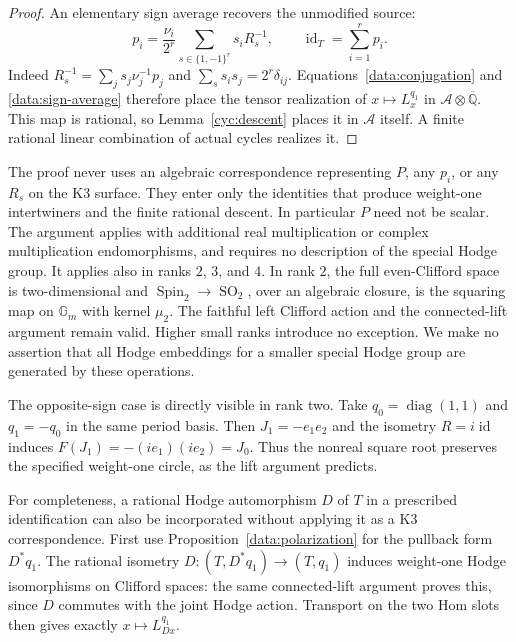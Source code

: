 \begin{proof}
An elementary sign average recovers the unmodified source:
\begin{equation}\label{data:sign-average}
 p_i=\frac{\nu_i}{2^r}
        \sum_{s\in\{1,-1\}^r}s_iR_s^{-1},
 \qquad \operatorname{id}_T=\sum_{i=1}^r p_i.
\end{equation}
Indeed $R_s^{-1}=\sum_j s_j\nu_j^{-1}p_j$ and
$\sum_s s_i s_j=2^r\delta_{ij}$.
Equations~\eqref{data:conjugation} and \eqref{data:sign-average}
therefore place the tensor realization of $x\mapsto L_x^{q_1}$
in $\mathcal A\otimes\overline{\mathbb Q}$.
This map is rational, so Lemma~\ref{cyc:descent} places it in
$\mathcal A$ itself. A finite rational linear combination of
actual cycles realizes it.
\end{proof}

\begin{remark}\label{data:scope}
The proof never uses an algebraic correspondence representing
$P$, any $p_i$, or any $R_s$ on the K3 surface. They enter only
the identities that produce weight-one intertwiners and the
finite rational descent. In particular $P$ need not be scalar.
The argument applies with additional real multiplication or
complex multiplication endomorphisms, and requires no description of the special
Hodge group. It applies also in ranks $2$, $3$, and $4$.
In rank $2$, the full even-Clifford space is two-dimensional and
$\operatorname{Spin}_2\to\operatorname{SO}_2$, over an algebraic
closure, is the squaring map on $\mathbb G_m$ with kernel
$\mu_2$. The faithful left Clifford action and the connected-lift
argument remain valid. Higher small ranks introduce no exception.
We make no assertion that all Hodge embeddings for a smaller
special Hodge group are generated by these operations.

The opposite-sign case is directly visible in rank two. Take
$q_0=\operatorname{diag}(1,1)$ and $q_1=-q_0$ in the same period
basis. Then $J_1=-e_1e_2$ and the isometry $R=i\operatorname{id}$
induces $F(J_1)=-(ie_1)(ie_2)=J_0$. Thus the nonreal square root
preserves the specified weight-one circle, as the lift argument predicts.
\end{remark}

For completeness, a rational Hodge automorphism $D$ of $T$ in a
prescribed identification can also be incorporated without
applying it as a K3 correspondence. First use
Proposition~\ref{data:polarization} for the pullback form $D^*q_1$.
The rational isometry $D:(T,D^*q_1)\to(T,q_1)$ induces
weight-one Hodge isomorphisms on Clifford spaces: the same
connected-lift argument proves this, since $D$ commutes with the
joint Hodge action. Transport on the two Hom slots then gives
exactly $x\mapsto L_{Dx}^{q_1}$.

